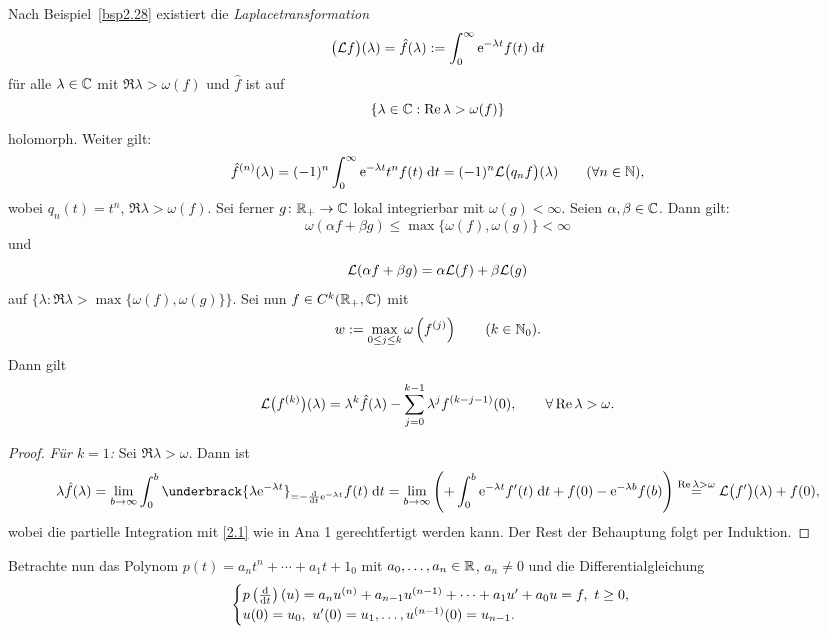 \documentclass[a4paper,twoside,DIV15,BCOR12mm]{scrbook}
\begin{document}
Nach Beispiel~\ref{bsp2.28} existiert die \textit{Laplacetransformation}
\[\bigl(\mathcal{L} f\bigr)(\lambda) = \hat{f}(\lambda):=\int_{0}^{\infty}{\mathrm{e}^{-\lambda t}f(t)}\;\mathrm{d} t\]
für alle $\lambda\in\mathbb{C}$ mit $\Re{\lambda}>\omega(f)$ und $\hat{f}$ ist auf
\[\{\lambda\in\mathbb{C}: \operatorname{Re}{\lambda}>\omega(f)\}\]
holomorph. Weiter gilt:
\begin{equation}\label{4.1}
\hat{f}^{(n)}(\lambda) = (-1)^n\int_{0}^{\infty}{\mathrm{e}^{-\lambda t}t^nf(t)}\;\mathrm{d} t = (-1)^n\mathcal{L}\bigl(q_nf\bigr)(\lambda)\qquad(\forall n\in\mathbb{N}),
\end{equation}
wobei $q_n(t) = t^n$, $\Re{\lambda}>\omega(f)$. Sei ferner $g\colon\mathbb{R}_+\to\mathbb{C}$ lokal integrierbar mit $\omega(g)<\infty$. Seien $\alpha, \beta\in\mathbb{C}$. Dann gilt:
\[\omega(\alpha f+\beta g)\leq\max\{\omega(f),\omega(g)\}<\infty\]
und
\begin{equation}\label{4.2}
\mathcal{L}(\alpha f+\beta g) = \alpha\mathcal{L}(f)+\beta\mathcal{L}(g)
\end{equation}
auf $\{\lambda:\Re{\lambda}>\max\{\omega(f),\omega(g)\}\}$. Sei nun $f\in C^k(\mathbb{R}_+,\mathbb{C})$ mit
\[w:=\max_{0\leq j\leq k}\omega\left(f^{(j)}\right)\qquad(k\in\mathbb{N}_0).\]
Dann gilt
\begin{equation}\label{4.3}
\mathcal{L}\bigl(f^{(k)}\bigr)(\lambda) = \lambda^k\hat{f}(\lambda)-\sum_{j=0}^{k-1}\lambda^jf^{(k-j-1)}(0),\qquad\forall\operatorname{Re}{\lambda}>\omega.
\end{equation}
\begin{proof}\textit{Für $k=1$:} Sei $\Re{\lambda}>\omega$. Dann ist
\[\lambda\hat{f}(\lambda)=\lim_{b\to\infty}\integral{0}{b}{\underbrack{\lambda\e^{-\lambda t}}_{=-\frac{\d}{\d t}\e^{-\lambda t}}f(t)}{t}=\lim_{b\to\infty}\left(+\integral{0}{b}{\e^{-\lambda t}f^\prime(t)}{t} + f(0) - \e^{-\lambda b}f(b)\right) \overset{\Re{\lambda}>\omega}{=} \L\bigl(f^\prime\bigr)(\lambda) + f(0),\]
wobei die partielle Integration mit \eqref{2.1} wie in Ana 1 gerechtfertigt werden kann. Der Rest der Behauptung folgt per Induktion.
\end{proof}

Betrachte nun das Polynom $p(t)=a_nt^n+\dotsb+a_1t+1_0$ mit $a_0,\dotsc,a_n\in\mathbb{R}$, $a_n\neq 0$ und die Differentialgleichung
\begin{equation}\label{4.4}
\begin{cases}
p\left(\frac{\mathrm{d}}{\mathrm{d} t}\right)(u) = a_nu^{(n)}+a_{n-1}u^{(n-1)}+\dotsb+a_1u^\prime+a_0u = f,\ t\geq 0,\\
u(0)=u_0,\ u^\prime(0) = u_1,\dotsc,u^{(n-1)}(0) = u_{n-1}.
\end{cases}
\end{equation}
\end{document}
